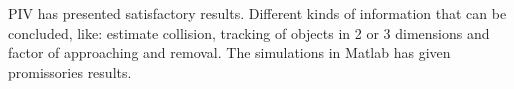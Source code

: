 
PIV has presented satisfactory results. Different kinds of information that can be concluded, like: estimate collision, tracking of
objects in 2 or 3 dimensions and factor of approaching and removal. The simulations in Matlab has given promissories results.

